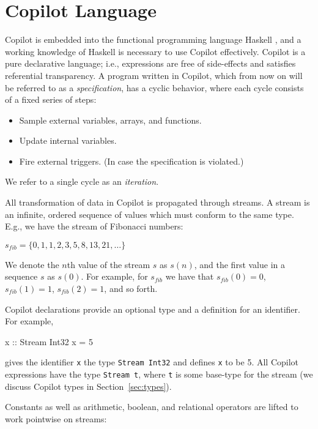 \section{Copilot Language} 
\label{sec:language}

Copilot is embedded into the functional programming language Haskell
\cite{PeytonJones02}, and a working knowledge of Haskell is necessary to use
Copilot effectively. Copilot is a pure declarative language; i.e., expressions
are free of side-effects and satisfies referential transparency.  A program
written in Copilot, which from now on will be referred to as a
\emph{specification}, has a cyclic behavior, where each cycle consists of a
fixed series of steps:

\begin{itemize}
\item Sample external variables, arrays, and functions.
\item Update internal variables.
\item Fire external triggers. (In case the specification is violated.)
\end{itemize}

\noindent We refer to a single cycle as an \emph{iteration}.

All transformation of data in Copilot is propagated through streams.
A stream is an infinite, ordered sequence of values which must conform to the same type.
E.g., we have the stream of Fibonacci numbers:

\begin{center}
$s_{fib} = \{0, 1, 1, 2, 3, 5, 8, 13, 21, \dots \}$
\end{center}

\noindent We denote the $n$th value of the stream $s$ as $s(n)$, and the first
value in a sequence $s$ as $s(0)$. For example, for $s_{fib}$ we have that $s_{fib}(0) = 0$,
$s_{fib}(1) = 1$, $s_{fib}(2) = 1$, and so forth.

Copilot declarations provide an optional type and a definition for an identifier.  For
example, 
%
\begin{code}
x :: Stream Int32
x = 5
\end{code}
%
\noindent 
gives the identifier {\tt x} the type {\tt Stream Int32} and defines {\tt x} to
be 5.  All Copilot expressions have the type {\tt Stream t}, where {\tt t} is
some base-type for the stream (we discuss Copilot types in
Section~\ref{sec:types}).

Constants as well as arithmetic, boolean, and relational operators are
lifted to work pointwise on streams:

